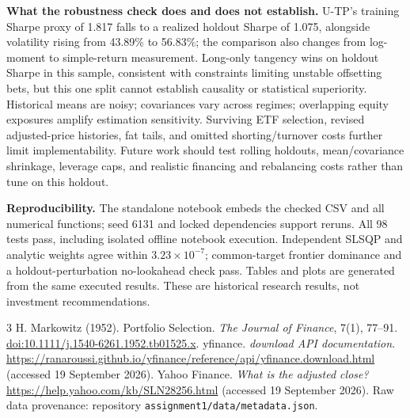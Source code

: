\documentclass[10pt,a4paper]{article}
\begin{document}
\textbf{What the robustness check does and does not establish.} U-TP's training Sharpe proxy of 1.817 falls to a realized holdout Sharpe of 1.075, alongside volatility rising from 43.89\% to 56.83\%; the comparison also changes from log-moment to simple-return measurement. Long-only tangency wins on holdout Sharpe in this sample, consistent with constraints limiting unstable offsetting bets, but this one split cannot establish causality or statistical superiority. Historical means are noisy; covariances vary across regimes; overlapping equity exposures amplify estimation sensitivity. Surviving ETF selection, revised adjusted-price histories, fat tails, and omitted shorting/turnover costs further limit implementability. Future work should test rolling holdouts, mean/covariance shrinkage, leverage caps, and realistic financing and rebalancing costs rather than tune on this holdout.

\textbf{Reproducibility.} The standalone notebook embeds the checked CSV and all numerical functions; seed 6131 and locked dependencies support reruns. All 98 tests pass, including isolated offline notebook execution. Independent SLSQP and analytic weights agree within $3.23\times10^{-7}$; common-target frontier dominance and a holdout-perturbation no-lookahead check pass. Tables and plots are generated from the same executed results. These are historical research results, not investment recommendations.

\begingroup
\footnotesize
\setlength{\parskip}{0pt}
\begin{thebibliography}{3}
\setlength{\itemsep}{0pt}
 H. Markowitz (1952). Portfolio Selection. \emph{The Journal of Finance}, 7(1), 77--91. \href{https://onlinelibrary.wiley.com/doi/10.1111/j.1540-6261.1952.tb01525.x}{doi:10.1111/j.1540-6261.1952.tb01525.x}.
 yfinance. \emph{download API documentation}. \url{https://ranaroussi.github.io/yfinance/reference/api/yfinance.download.html} (accessed 19 September 2026).
 Yahoo Finance. \emph{What is the adjusted close?} \url{https://help.yahoo.com/kb/SLN28256.html} (accessed 19 September 2026). Raw data provenance: repository \texttt{assignment1/data/metadata.json}.
\end{thebibliography}
\endgroup
\end{document}
